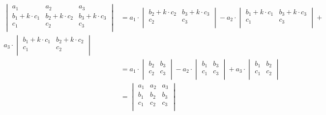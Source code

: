 \documentclass{article}
\begin{document}
\begin{equation*}
\begin{split}
  \begin{vmatrix}
    a_1 & a_2 & a_3 \\
    b_1 + k \cdot c_1 & b_2 + k \cdot c_2 & b_3 + k \cdot c_3 \\
    c_1 & c_2 & c_3 \\
  \end{vmatrix} 
  &= a_1 \cdot \begin{vmatrix}
                 b_2 + k \cdot c_2 & b_3 + k \cdot c_3 \\
                 c_2 & c_3 \\ 
               \end{vmatrix} -
     a_2 \cdot \begin{vmatrix}
                 b_1 + k \cdot c_1 & b_3 + k \cdot c_3 \\
                 c_1 & c_3 \\
               \end{vmatrix} + \\
     a_3 \cdot \begin{vmatrix}
                 b_1 + k \cdot c_1 & b_2 + k \cdot c_2 \\
                 c_1 & c_2 \\ 
               \end{vmatrix} \\
  &= a_1 \cdot \begin{vmatrix}
                 b_2 & b_3 \\
                 c_2 & c_3 \\ 
               \end{vmatrix} -
     a_2 \cdot \begin{vmatrix}
                 b_1 & b_3 \\
                 c_1 & c_3 \\
               \end{vmatrix} + 
     a_3 \cdot \begin{vmatrix}
                 b_1 & b_2 \\
                 c_1 & c_2 \\ 
               \end{vmatrix} \\
  &= \begin{vmatrix}
       a_1 & a_2 & a_3 \\
       b_1 & b_2 & b_3 \\
       c_1 & c_2 & c_3 \\
     \end{vmatrix} \\
\end{split}
\end{equation*}
\end{document}
